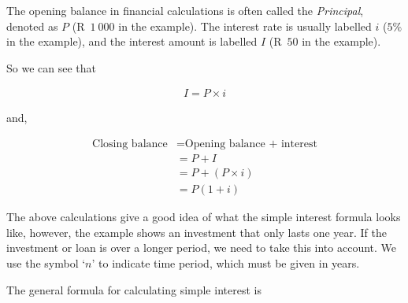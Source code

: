 The opening balance in financial calculations is often called the \textsl{Principal}, denoted as $P$ (R~$1~000$ in the example). The interest rate is usually labelled $i$ ($5\%$ in the example), and the interest amount is labelled $I$ (R~$50$ in the example).\par 

So we can see that
        
\begin{align*}
    I = P \times i
\end{align*}

and,

\begin{align*}
    \mbox{Closing balance} &= \mbox{Opening balance + interest} \nonumber\\
    &= P + I \nonumber\\
    &= P + (P \times i)\nonumber\\
    &= P(1 + i)
\end{align*}



The above calculations give a good idea of what the simple interest formula looks like, however, the example shows an investment that only lasts one year. If the investment or loan is over a longer period, we need to take this
into account. We use the symbol ‘$n$’ to indicate time period, which must be given in years.\par

The general formula for calculating simple interest is





